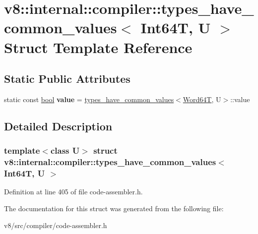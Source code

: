\hypertarget{structv8_1_1internal_1_1compiler_1_1types__have__common__values_3_01Int64T_00_01U_01_4}{}\section{v8\+:\+:internal\+:\+:compiler\+:\+:types\+\_\+have\+\_\+common\+\_\+values$<$ Int64T, U $>$ Struct Template Reference}
\label{structv8_1_1internal_1_1compiler_1_1types__have__common__values_3_01Int64T_00_01U_01_4}
\subsection*{Static Public Attributes}
\begin{DoxyCompactItemize}
\item 
\mbox{\label{structv8_1_1internal_1_1compiler_1_1types__have__common__values_3_01Int64T_00_01U_01_4_ae4186639775c8642631e540e4b8fa604}} 
static const \mbox{\hyperlink{classbool}{bool}} {\bfseries value} = \mbox{\hyperlink{structv8_1_1internal_1_1compiler_1_1types__have__common__values}{types\+\_\+have\+\_\+common\+\_\+values}}$<$\mbox{\hyperlink{structv8_1_1internal_1_1Word64T}{Word64T}}, U$>$\+::value
\end{DoxyCompactItemize}


\subsection{Detailed Description}
\subsubsection*{template$<$class U$>$\newline
struct v8\+::internal\+::compiler\+::types\+\_\+have\+\_\+common\+\_\+values$<$ Int64\+T, U $>$}



Definition at line 405 of file code-\/assembler.\+h.



The documentation for this struct was generated from the following file\+:\begin{DoxyCompactItemize}
\item 
v8/src/compiler/code-\/assembler.\+h\end{DoxyCompactItemize}
